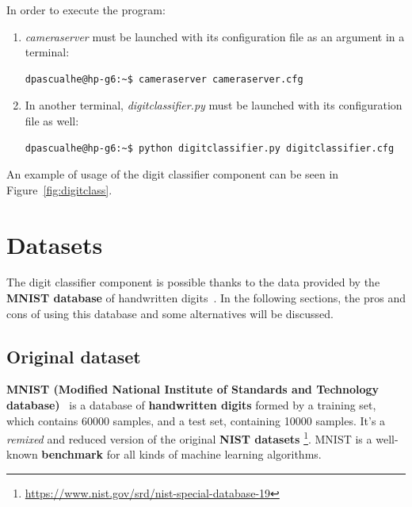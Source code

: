 In order to execute the program:
\begin{enumerate}
	\item \textit{cameraserver} must be launched with its configuration file as an argument in a terminal:
\begin{Verbatim}[frame=single]
dpascualhe@hp-g6:~$ cameraserver cameraserver.cfg
\end{Verbatim}
	
	\item In another terminal, \textit{digitclassifier.py} must be launched with its configuration file as well:
\begin{Verbatim}[frame=single]
dpascualhe@hp-g6:~$ python digitclassifier.py digitclassifier.cfg
\end{Verbatim}
\end{enumerate}

An example of usage of the digit classifier component can be seen in Figure~\ref{fig:digitclass}.

\section{Datasets}\label{sec:datasets}
The digit classifier component is possible thanks to the data provided by the \textbf{MNIST database} of handwritten digits~\cite{lecun-mnisthandwrittendigit-2010}. In the following sections, the pros and cons of using this database and some alternatives will be discussed.

\subsection{Original dataset}\label{subsec:MNIST}
\textbf{MNIST (Modified National Institute of Standards and Technology database)}~\cite{lecun-mnisthandwrittendigit-2010} is a database of \textbf{handwritten digits} formed by a training set, which contains 60000 samples, and a test set, containing 10000 samples. It's a \textit{remixed} and reduced version of the original \textbf{NIST datasets} \footnote{\url{https://www.nist.gov/srd/nist-special-database-19}}. MNIST is a well-known \textbf{benchmark} for all kinds of machine learning algorithms.

